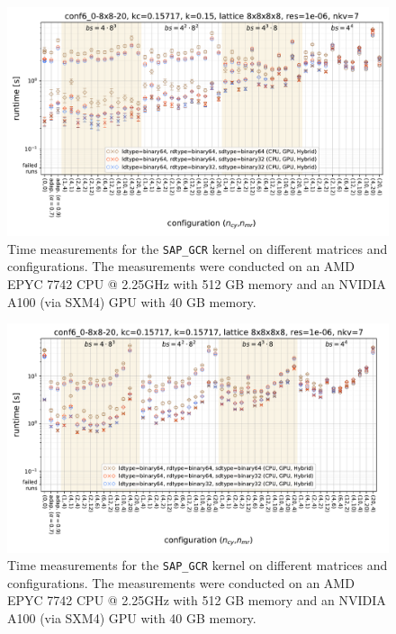 \documentclass{article}
\theoremstyle{plain} %
\theoremstyle{convention} %
\theoremstyle{remark} %
\def\code#1{\texttt{#1}}
\numberwithin{equation}{section}
\begin{document}
\begin{figure}[htbp]
    \centering
    \includegraphics[width=1.0\textwidth]{plots/sap_gcr_conf6_0-8x8-20_kc=0.15717_k=0.15_lattice_8x8x8x8_res=1e-06_nkv=7}
    \caption{Time measurements for the \code{SAP\_GCR} kernel on different matrices and configurations. The measurements were conducted on an AMD EPYC 7742 CPU @ 2.25GHz with 512 GB memory and an NVIDIA A100 (via SXM4) GPU with 40 GB memory.}
    \label{fig:sap_gcr2}
    \label{fig:sap_gcr_conf6_0-8x8-20_0.15}
\end{figure}

\begin{figure}[htbp]
    \centering
    \includegraphics[width=1.0\textwidth]{plots/sap_gcr_conf6_0-8x8-20_kc=0.15717_k=0.15717_lattice_8x8x8x8_res=1e-06_nkv=7}
    \caption{Time measurements for the \code{SAP\_GCR} kernel on different matrices and configurations. The measurements were conducted on an AMD EPYC 7742 CPU @ 2.25GHz with 512 GB memory and an NVIDIA A100 (via SXM4) GPU with 40 GB memory.}
    \label{fig:sap_gcr1}
    \label{fig:sap_gcr_conf6_0-8x8-20_0.15717}
\end{figure}
\end{document}
